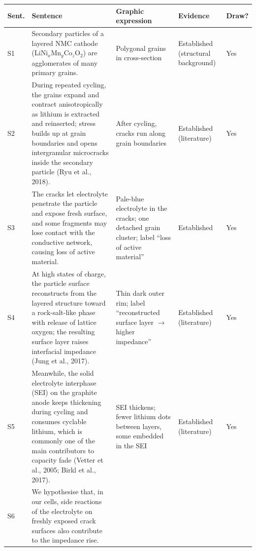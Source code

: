 \begingroup
\setlength{\tabcolsep}{1.6pt}
\renewcommand{\arraystretch}{1}
\newcommand{\cellfont}{\fontsize{8}{9.3}\selectfont}
\newcommand{\gr}{\leavevmode\color{gray}}
\begin{tabularx}{\linewidth}{@{}
  >{\cellfont}l
  >{\cellfont}Y
  >{\cellfont\raggedright\arraybackslash}p{26mm}
  >{\cellfont\raggedright\arraybackslash}p{21mm}
  >{\cellfont\raggedright\arraybackslash}p{15.5mm}
@{}}
\toprule
\textbf{Sent.} & \textbf{Sentence} & \textbf{Graphic expression} & \textbf{Evidence} & \textbf{Draw?} \\
\midrule
S1 & Secondary particles of a layered NMC cathode (LiNi$_x$Mn$_y$Co$_z$O$_2$) are agglomerates of many primary grains.
   & Polygonal grains in cross-section
   & Established (structural background) & Yes \\
S2 & During repeated cycling, the grains expand and contract anisotropically as lithium is extracted and reinserted; stress builds up at grain boundaries and opens intergranular microcracks inside the secondary particle (Ryu et al., 2018).
   & After cycling, cracks run along grain boundaries
   & Established (literature) & Yes \\
S3 & The cracks let electrolyte penetrate the particle and expose fresh surface, and some fragments may lose contact with the conductive network, causing loss of active material.
   & Pale-blue electrolyte in the cracks; one detached grain cluster; label ``loss of active material''
   & Established & Yes \\
S4 & At high states of charge, the particle surface reconstructs from the layered structure toward a rock-salt-like phase with release of lattice oxygen; the resulting surface layer raises interfacial impedance (Jung et al., 2017).
   & Thin dark outer rim; label ``reconstructed surface layer $\rightarrow$ higher impedance''
   & Established (literature) & Yes \\
S5 & Meanwhile, the solid electrolyte interphase (SEI) on the graphite anode keeps thickening during cycling and consumes cyclable lithium, which is commonly one of the main contributors to capacity fade (Vetter et al., 2005; Birkl et al., 2017).
   & SEI thickens; fewer lithium dots between layers, some embedded in the SEI
   & Established (literature) & Yes \\
S6 & We hypothesise that, in our cells, side reactions of the electrolyte on freshly exposed crack surfaces also contribute to the impedance rise.

\end{tabularx}

